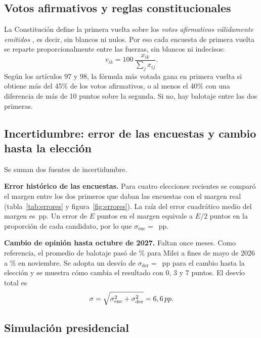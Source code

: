 \documentclass{article}
\newcommand{\pp}{\,pp}
\begin{document}
\subsection{Votos afirmativos y reglas constitucionales}

La Constitución define la primera vuelta sobre los \emph{votos afirmativos
válidamente emitidos} \cite{constitucion}, es decir, sin blancos ni nulos. Por
eso cada encuesta de primera vuelta se reparte proporcionalmente entre las
fuerzas, sin blancos ni indecisos:
\begin{equation}
  v_{ik} = 100\,\frac{x_{ik}}{\sum_{j} x_{ij}}.
\end{equation}
Según los artículos 97 y 98, la fórmula más votada gana en primera vuelta si
obtiene más del 45\% de los votos afirmativos, o al menos el 40\% con una
diferencia de más de 10 puntos sobre la segunda. Si no, hay balotaje entre las
dos primeras.

\subsection{Incertidumbre: error de las encuestas y cambio hasta la elección}
\label{sec:incert}

Se suman dos fuentes de incertidumbre.

\textbf{Error histórico de las encuestas.} Para cuatro elecciones recientes se
comparó el margen entre los dos primeros que daban las encuestas con el margen
real (tabla~\ref{tab:errores} y figura~\ref{fig:errores}). La raíz del error
cuadrático medio del margen es \rmseMargen\pp. Un error de $E$ puntos en el
margen equivale a $E/2$ puntos en la proporción de cada candidato, por lo que
$\sigma_{\text{enc}} = $ \sigmaEnc\pp.

\textbf{Cambio de opinión hasta octubre de 2027.} Faltan once meses. Como
referencia, el promedio de balotaje pasó de \muBalMayo\% para Milei a fines de
mayo de 2026 a \muBal\% en noviembre. Se adopta un desvío de
$\sigma_{\text{der}} = $ \sigmaDeriva\pp{} para el cambio hasta la elección y se
muestra cómo cambia el resultado con 0, 3 y 7 puntos. El desvío total es
\begin{equation}
  \sigma = \sqrt{\sigma_{\text{enc}}^2 + \sigma_{\text{der}}^2} = \sigmaTotal\pp.
\end{equation}

\subsection{Simulación presidencial}
\end{document}
